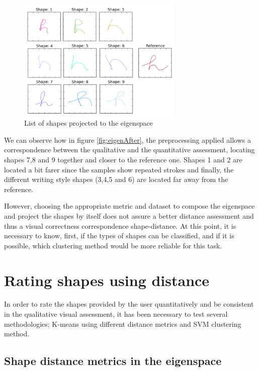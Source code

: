 \begin{figure}[h!]
        \centering
        \includegraphics[width=0.7\textwidth]{figures/shapeList.png}
        \caption{List of shapes projected to the eigenspace}
        \label{fig:shapeList}
\end{figure}

We can observe how in figure \ref{fig:eigenAfter}, the preprocessing applied allows a correspondence between the qualitative and the quantitative assessment, locating shapes 7,8 and 9 together and closer to the reference one. Shapes 1 and 2 are located a bit farer since the samples show repeated strokes and finally, the different writing style shapes (3,4,5 and 6) are located far away from the reference.

However, choosing the appropriate metric and dataset to compose the eigenspace and project the shapes by itself does not assure a better distance assessment and thus a visual correctness correspondence shape-distance. At this point, it is necessary to know, first, if the types of shapes can be classified, and if it is possible, which clustering method would be more reliable for this task.


\section{Rating shapes using distance}
In order to rate the shapes provided by the user quantitatively and be consistent in the qualitative visual assessment, it has been necessary to test several methodologies; K-means using different distance metrics and SVM clustering method.
 
\subsection{Shape distance metrics in the eigenspace}  

